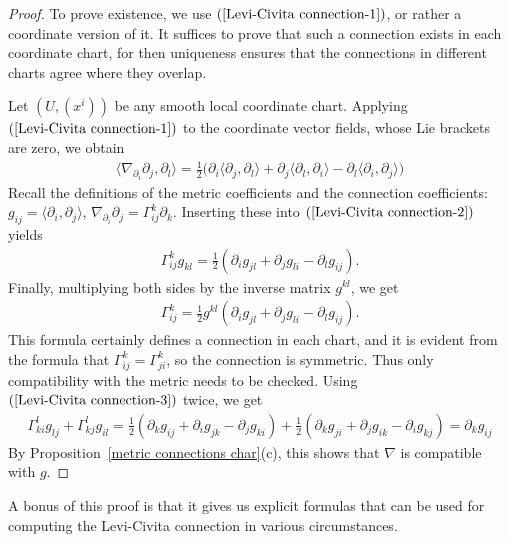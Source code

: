 \begin{proof}
To prove existence, we use $(\ref{Levi-Civita connection-1})$, or rather a coordinate version of it. It suffices to prove that such a connection exists in each coordinate chart, for then uniqueness ensures that the connections in different charts agree where they overlap.\par
Let $(U,(x^i))$ be any smooth local coordinate chart. Applying $(\ref{Levi-Civita connection-1})$ to the coordinate vector fields, whose Lie brackets are zero, we obtain
\begin{align}\label{Levi-Civita connection-2}
\langle\nabla_{\partial_i}\partial_j,\partial_l\rangle=\frac{1}{2}\big(\partial_i\langle\partial_j,\partial_l\rangle+\partial_j\langle \partial_l,\partial_i\rangle-\partial_l\langle\partial_i,\partial_j\rangle\big)
\end{align}
Recall the definitions of the metric coefficients and the connection coefficients: $g_{ij}=\langle\partial_i,\partial_j\rangle$, $\nabla_{\partial_i}\partial_j=\Gamma_{ij}^k\partial_k$. 
Inserting these into $(\ref{Levi-Civita connection-2})$ yields
\begin{align}\label{Levi-Civita connection-3}
\Gamma_{ij}^kg_{kl}=\frac{1}{2}(\partial_ig_{jl}+\partial_jg_{li}-\partial_lg_{ij}).
\end{align}
Finally, multiplying both sides by the inverse matrix $g^{kl}$, we get
\begin{align}\label{Levi-Civita connection-4}
\Gamma_{ij}^k=\frac{1}{2}g^{kl}(\partial_ig_{jl}+\partial_jg_{li}-\partial_lg_{ij}).
\end{align}
This formula certainly defines a connection in each chart, and it is evident from the formula that $\Gamma_{ij}^k=\Gamma_{ji}^k$, so the connection is symmetric. Thus only 
compatibility with the metric needs to be checked. Using $(\ref{Levi-Civita connection-3})$ twice, we get
\begin{align*}
\Gamma_{ki}^lg_{lj}+\Gamma_{kj}^lg_{il}=\frac{1}{2}(\partial_kg_{ij}+\partial_ig_{jk}-\partial_jg_{ki})+\frac{1}{2}(\partial_kg_{ji}+\partial_jg_{ik}-\partial_ig_{kj})=\partial_kg_{ij}
\end{align*}
By Proposition~\ref{metric connections char}(c), this shows that $\nabla$ is compatible with $g$.
\end{proof}
A bonus of this proof is that it gives us explicit formulas that can be used for computing the Levi-Civita connection in various circumstances.
